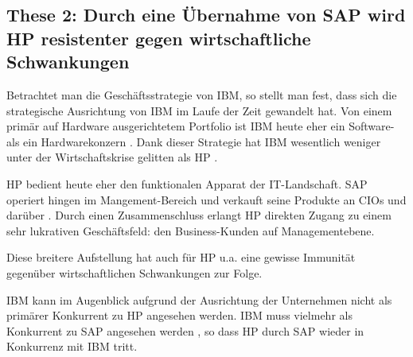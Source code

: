 \documentclass[a4paper,10pt,left=1.5cm,right=1.5cm,top=1.5cm,bottom=1.5cm]{article}
\begin{document}
\subsection*{These 2: Durch eine Übernahme von SAP wird HP resistenter gegen wirtschaftliche Schwankungen}

Betrachtet man die Geschäftsstrategie von IBM, so stellt man fest, dass sich die strategische Ausrichtung von IBM im Laufe der Zeit gewandelt hat.
Von einem primär auf Hardware ausgerichtetem Portfolio ist IBM heute eher ein Software- als ein Hardwarekonzern \cite{ibmvshp}.
Dank dieser Strategie hat IBM wesentlich weniger unter der Wirtschaftskrise gelitten als HP \cite{ibmvshp}.

HP bedient heute eher den funktionalen Apparat der IT-Landschaft.
SAP operiert hingen im Mangement-Bereich und verkauft seine Produkte an CIOs und darüber \cite{cioandabove}.
Durch einen Zusammenschluss erlangt HP direkten Zugang zu einem sehr lukrativen Geschäftsfeld: den Business-Kunden auf Managementebene.

Diese breitere Aufstellung hat auch für HP u.a. eine gewisse Immunität gegenüber wirtschaftlichen Schwankungen zur Folge.

IBM kann im Augenblick aufgrund der Ausrichtung der Unternehmen nicht als primärer Konkurrent zu HP angesehen werden.
IBM muss vielmehr als Konkurrent zu SAP angesehen werden \cite{ibmvssap}, so dass HP durch SAP wieder in Konkurrenz mit IBM tritt.

%
%
%
%
%
%
%
%
\end{document}
